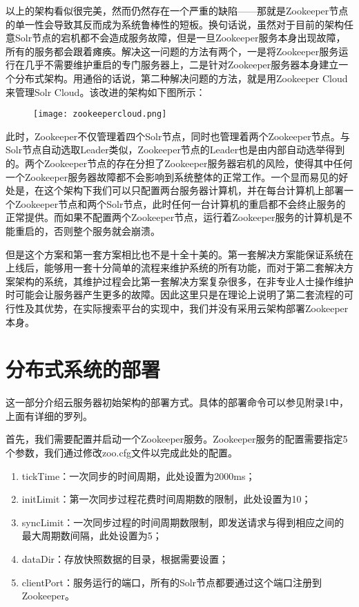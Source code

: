 以上的架构看似很完美，然而仍然存在一个严重的缺陷——那就是Zookeeper节点的单一性会导致其反而成为系统鲁棒性的短板。换句话说，虽然对于目前的架构任意Solr节点的宕机都不会造成服务故障，但是一旦Zookeeper服务本身出现故障，所有的服务都会跟着瘫痪。解决这一问题的方法有两个，一是将Zookeeper服务运行在几乎不需要维护重启的专门服务器上，二是针对Zookeeper服务器本身建立一个分布式架构。用通俗的话说，第二种解决问题的方法，就是用Zookeeper Cloud来管理Solr Cloud。该改进的架构如下图所示：
\begin{figure}[!htp]
  \centering
  \texttt{[image: zookeepercloud.png]}
\end{figure}
此时，Zookeeper不仅管理着四个Solr节点，同时也管理着两个Zookeeper节点。与Solr节点自动选取Leader类似，Zookeeper节点的Leader也是由内部自动选举得到的。两个Zookeeper节点的存在分担了Zookeeper服务器宕机的风险，使得其中任何一个Zookeeper服务器故障都不会影响到系统整体的正常工作。一个显而易见的好处是，在这个架构下我们可以只配置两台服务器计算机，并在每台计算机上部署一个Zookeeper节点和两个Solr节点，此时任何一台计算机的重启都不会终止服务的正常提供。而如果不配置两个Zookeeper节点，运行着Zookeeper服务的计算机是不能重启的，否则整个服务就会崩溃。

但是这个方案和第一套方案相比也不是十全十美的。第一套解决方案能保证系统在上线后，能够用一套十分简单的流程来维护系统的所有功能，而对于第二套解决方案架构的系统，其维护过程会比第一套解决方案复杂很多，在非专业人士操作维护时可能会让服务器产生更多的故障。因此这里只是在理论上说明了第二套流程的可行性及其优势，在实际搜索平台的实现中，我们并没有采用云架构部署Zookeeper本身。

\section{分布式系统的部署}
这一部分介绍云服务器初始架构的部署方式。具体的部署命令可以参见附录1中，上面有详细的罗列。

首先，我们需要配置并启动一个Zookeeper服务。Zookeeper服务的配置需要指定5个参数，我们通过修改zoo.cfg文件以完成此处的配置。
\begin{enumerate}
\item tickTime：一次同步的时间周期，此处设置为2000ms；
\item initLimit：第一次同步过程花费时间周期数的限制，此处设置为10；
\item syncLimit：一次同步过程的时间周期数限制，即发送请求与得到相应之间的最大周期数间隔，此处设置为5；
\item dataDir：存放快照数据的目录，根据需要设置；
\item clientPort：服务运行的端口，所有的Solr节点都要通过这个端口注册到Zookeeper。
\end{enumerate}

